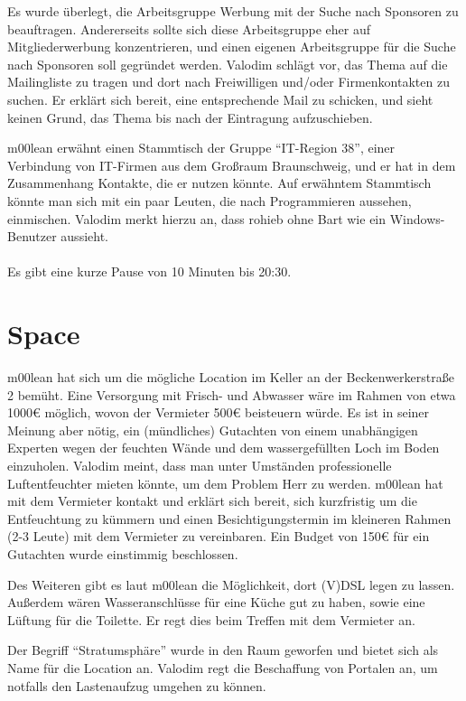 \documentclass[a4paper,12pt]{scrartcl}
\begin{document}
Es wurde überlegt, die Arbeitsgruppe Werbung mit der Suche nach Sponsoren zu
beauftragen. Andererseits sollte sich diese Arbeitsgruppe eher auf
Mitgliederwerbung konzentrieren, und einen eigenen Arbeitsgruppe für die Suche
nach Sponsoren soll gegründet werden. Valodim schlägt vor, das Thema auf die
Mailingliste zu tragen und dort nach Freiwilligen und/oder Firmenkontakten zu
suchen. Er erklärt sich bereit, eine entsprechende Mail zu schicken, und sieht
keinen Grund, das Thema bis nach der Eintragung aufzuschieben.

m00lean erwähnt einen Stammtisch der Gruppe "`IT-Region 38"', einer Verbindung
von IT-Firmen aus dem Großraum Braunschweig, und er hat in dem
Zusammenhang Kontakte, die er nutzen könnte. Auf erwähntem Stammtisch könnte man
sich mit ein paar Leuten, die nach Programmieren aussehen, einmischen. Valodim
merkt hierzu an, dass rohieb ohne Bart wie ein Windows-Benutzer aussieht.\\
\\
Es gibt eine kurze Pause von 10 Minuten bis 20:30.

\section{Space}
m00lean hat sich um die mögliche Location im Keller an der Beckenwerkerstraße 2
bemüht. Eine Versorgung mit Frisch- und Abwasser wäre im Rahmen von etwa 1000€
möglich, wovon der Vermieter 500€ beisteuern würde. Es ist in seiner Meinung
aber nötig, ein (mündliches) Gutachten von einem unabhängigen Experten wegen der
feuchten Wände und dem wassergefüllten Loch im Boden einzuholen. Valodim meint,
dass man unter Umständen professionelle Luftentfeuchter mieten könnte, um dem
Problem Herr zu werden. m00lean hat mit dem Vermieter kontakt und erklärt sich
bereit, sich kurzfristig um die Entfeuchtung zu kümmern und einen
Besichtigungstermin im kleineren Rahmen (2-3 Leute) mit dem Vermieter zu
vereinbaren. Ein Budget von 150€ für ein Gutachten wurde einstimmig beschlossen.

Des Weiteren gibt es laut m00lean die Möglichkeit, dort (V)DSL legen zu lassen.
Außerdem wären Wasseranschlüsse für eine Küche gut zu haben, sowie eine Lüftung
für die Toilette. Er regt dies beim Treffen mit dem Vermieter an.

Der Begriff "`Stratumsphäre"' wurde in den Raum geworfen und bietet sich als
Name für die Location an. Valodim regt die Beschaffung von Portalen an, um
notfalls den Lastenaufzug umgehen zu können.
\end{document}
